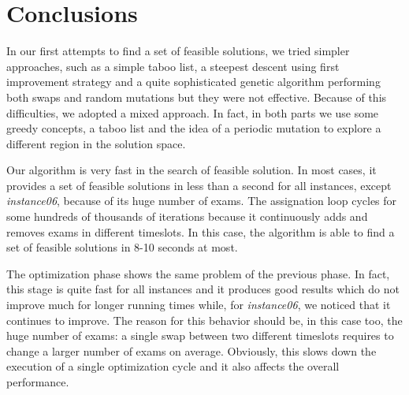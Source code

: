 \section*{Conclusions}
In our first attempts to find a set of feasible solutions, we tried simpler approaches, such as a simple taboo list, a steepest descent using first improvement strategy and a quite sophisticated genetic algorithm performing both swaps and random mutations but they were not effective. Because of this difficulties, we adopted a mixed approach. In fact, in both parts we use some greedy concepts, a taboo list and the idea of a periodic mutation to explore a different region in the solution space.

Our algorithm is very fast in the search of feasible solution. In most cases, it provides a set of feasible solutions in less than a second for all instances, except \emph{instance06}, because of its huge number of exams. The assignation loop cycles for some hundreds of thousands of iterations because it continuously adds and removes exams in different timeslots. In this case, the algorithm is able to find a set of feasible solutions in 8-10 seconds at most.

The optimization phase shows the same problem of the previous phase. In fact, this stage is quite fast for all instances and it produces good results which do not improve much for longer running times while, for \emph{instance06}, we noticed that it continues to improve. The reason for this behavior should be, in this case too, the huge number of exams: a single swap between two different timeslots requires to change a larger number of exams on average. Obviously, this slows down the execution of a single optimization cycle and it also affects the overall performance.


